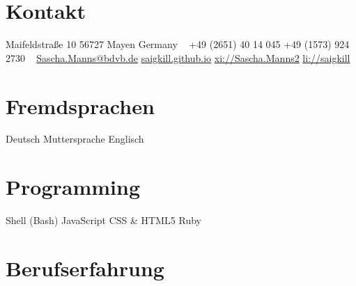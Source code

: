 \documentclass[a4paper,latin]{friggeri-cv} %
\begin{document}




\begin{aside} %
\section{Kontakt}
Maifeldstraße 10
56727 Mayen
Germany
~
+49 (2651) 40 14 045
+49 (1573) 924 2730
~
\href{mailto:Sascha.Manns@bdvb.de}{Sascha.Manns@bdvb.de}
\href{http://saigkill.github.io}{saigkill.github.io}
\href{https://www.xing.com/profile/Sascha_Manns2}{xi://Sascha.Manns2}
\href{http://de.linkedin.com/in/saigkill}{li://saigkill} 
\section{Fremdsprachen}
Deutsch Muttersprache
Englisch
\section{Programming}
{Shell (Bash)}
{JavaScript}
{CSS \& HTML5}
{Ruby}
\end{aside}


\section{Berufserfahrung}
\end{document}
